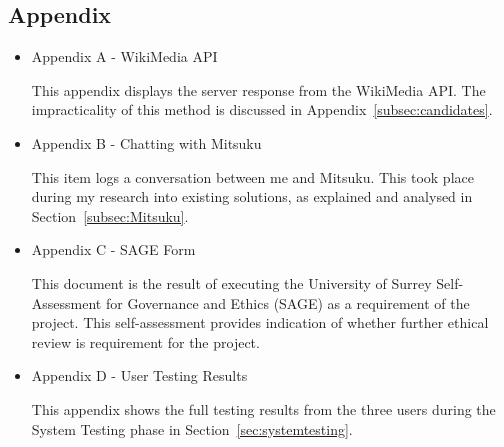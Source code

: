 \subsection*{Appendix}
\begin{itemize}
	\item Appendix A - WikiMedia API
	\par This appendix displays the server response from the WikiMedia API. The impracticality of this method is discussed in Appendix~\ref{subsec:candidates}.
	
	\item Appendix B - Chatting with Mitsuku
	\par This item logs a conversation between me and Mitsuku. This took place during my research into existing solutions, as explained and analysed in Section~\ref{subsec:Mitsuku}.
	
	\item Appendix C - SAGE Form
	\par This document is the result of executing the University of Surrey Self-Assessment for Governance and Ethics (SAGE) as a requirement of the project. This self-assessment provides indication of whether further ethical review is requirement for the project.
	
	\item Appendix D - User Testing Results
	\par This appendix shows the full testing results from the three users during the System Testing phase in Section~\ref{sec:systemtesting}.
\end{itemize}

